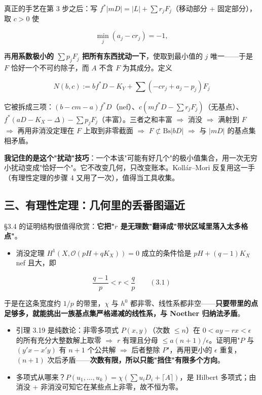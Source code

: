 真正的手艺在第 3 步之后：写 $f^*|mD|=|L|+\sum r_jF_j$（移动部分 + 固定部分），取 $c>0$ 使

\[
\min_j(a_j-cr_j)=-1,
\]

再\textbf{用系数极小的 $\sum p_jF_j$ 把所有东西扰动一下}，使取到最小值的 $j$ 唯一——于是 $F$ 恰好一个不可约除子，而 $A$ 不含 $F$ 为其成分。定义

\[
N(b,c):=bf^*D-K_Y+\sum(-cr_j+a_j-p_j)F_j
\]

它被拆成三项：$(b-cm-a)f^*D$（nef）、$c(mf^*D-\sum r_jF_j)$（无基点）、$f^*(aD-K_X-\Delta)-\sum p_jF_j$（丰富）。三者之和丰富 $\Rightarrow$ 消没 $\Rightarrow$ 满射到 $F$ $\Rightarrow$ 再用非消没定理在 $F$ 上取到非零截面 $\Rightarrow$ $F\not\subset\mathrm{Bs}|bD|$ $\Rightarrow$ 与 $|mD|$ 的基点集相矛盾。

\textbf{我记住的是这个"扰动"技巧}：一个本该"可能有好几个"的极小值集合，用一次无穷小扰动变成"恰好一个"。它不改变几何，只改变账本。Kollár--Mori 反复用这一手（有理性定理的步骤 4 又用了一次），值得当工具收集。

\subsection*{三、有理性定理：几何里的丢番图逼近}

\S3.4 的证明结构很值得欣赏：\textbf{它把"$r$ 是无理数"翻译成"带状区域里落入太多格点"}。

\begin{itemize}
\item 消没定理 $H^1(X,\mathcal{O}(pH+qK_X))=0$ 成立的条件恰是 $pH+(q-1)K_X$ nef 且大，即
\end{itemize}

\[
\frac{q-1}{p}<r<\frac{q}{p}\qquad(3.1)
\]

于是在这条宽度约 $1/p$ 的带里，$\chi$ 与 $h^0$ 都非零、线性系都非空——\textbf{只要带里的点足够多，就能挑出一族基点集严格递减的线性系，与 Noether 归纳法矛盾}。
\begin{itemize}
\item 引理 3.19 是纯数论：非零多项式 $P(x,y)$（次数 $\le n$）在 $0<ay-rx<\epsilon$ 的所有充分大整数解上取零 $\Rightarrow$ $r$ 有理且分母 $\le a(n+1)/\epsilon$。证明用"$P$ 与 $(y'x-x'y)$ 有 $n+1$ 个公共解 $\Rightarrow$ 后者整除 $P$"，再用更小的 $\epsilon$ 重复，$(n+1)$ 次后矛盾——\textbf{次数有限，所以只能"挡住"有限多个方向}。
\item 多项式从哪来？$P(u_1,\dots,u_k)=\chi(\sum u_iD_i+\lceil A\rceil)$，是 Hilbert 多项式；由消没 + 非消没可知它在某些点上非零，故不恒为零。
\end{itemize}

